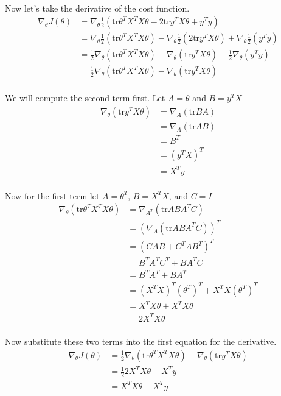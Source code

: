 \documentclass{article}
\begin{document}
\\
Now let's take the derivative of the cost function.
\begin{align*}
\nabla_\theta J(\theta) &= \nabla_\theta \frac{1}{2}(\text{tr}\theta^TX^TX\theta - 2\text{tr}y^TX\theta+y^Ty)\\
&= \nabla_\theta \frac{1}{2}(\text{tr}\theta^TX^TX\theta) - \nabla_\theta \frac{1}{2}(2\text{tr}y^TX\theta)+\nabla_\theta \frac{1}{2}(y^Ty)\\
&= \frac{1}{2} \nabla_\theta(\text{tr}\theta^TX^TX\theta) - \nabla_\theta (\text{tr}y^TX\theta)+\frac{1}{2} \nabla_\theta (y^Ty)\\
&= \frac{1}{2} \nabla_\theta(\text{tr}\theta^TX^TX\theta) - \nabla_\theta (\text{tr}y^TX\theta)\\
\end{align*}


We will compute the second term first. Let $A=\theta$ and $B=y^TX$
\begin{align*}
\nabla_\theta (\text{tr}y^TX\theta) &= \nabla_A (\text{tr}BA)\\
&= \nabla_A (\text{tr}AB)\\
&= B^T\\
&= {(y^TX)}^T\\
&= X^Ty\\
\end{align*}

Now for the first term let $A=\theta^T$, $B=X^TX$, and $C=I$
\begin{align*}
\nabla_\theta(\text{tr}\theta^TX^TX\theta) &= \nabla_{A^T}(\text{tr}ABA^TC)\\
&= {(\nabla_{A}(\text{tr}ABA^TC))}^T\\
&= {(CAB+C^TAB^T)}^T\\
&= B^TA^TC^T+BA^TC\\
&= B^TA^T+BA^T\\
&= {(X^TX)}^T{(\theta^T)}^T+X^TX{(\theta^T)}^T\\
&= X^TX\theta+X^TX\theta\\
&= 2X^TX\theta\\
\end{align*}

Now substitute these two terms into the first equation for the derivative.
\begin{align*}
\nabla_\theta J(\theta) &= \frac{1}{2} \nabla_\theta(\text{tr}\theta^TX^TX\theta) - \nabla_\theta (\text{tr}y^TX\theta) \\
&= \frac{1}{2} 2X^TX\theta - X^Ty \\
&= X^TX\theta - X^Ty \\
\end{align*}
\end{document}
